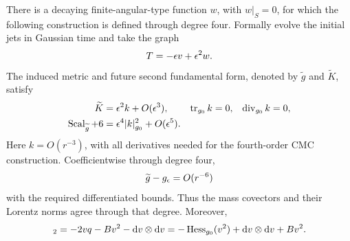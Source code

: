 \begin{lemma}
\label{lem:slice}
There is a decaying finite-angular-type function \(w\), with
\(w|_S=0\), for which the following construction is defined through
degree four.  Formally evolve the initial jets in Gaussian time and
take the graph
\begin{equation}
 T=-\epsilon v+\epsilon^2w.
 \label{quart:time-graph}
\end{equation}
The induced metric and future second fundamental form, denoted by
\(\widetilde g\) and \(\widetilde K\), satisfy
\begin{align}
 \widetilde K&=\epsilon^2k+O(\epsilon^3),
 &\operatorname{tr}_{g_0}k&=0,&\operatorname{div}_{g_0}k&=0,
 \label{quart:leading-k}\\
 \operatorname{Scal}_{\widetilde g}+6
   &=\epsilon^4|k|_{g_0}^2+O(\epsilon^5).
 \label{quart:scalar-four}
\end{align}
Here \(k=O(r^{-3})\), with all derivatives needed for the fourth-order
CMC construction.  Coefficientwise through degree four,
\begin{equation}
 \widetilde g-g_\epsilon=O(r^{-6})
 \label{quart:metric-decay}
\end{equation}
with the required differentiated bounds.  Thus the mass covectors and
their Lorentz norms agree through that degree.  Moreover,
\begin{equation}
 [\widetilde g-g_\eps]_2
   =-2vq-Bv^2-\dd v\otimes\dd v
   =-\Hess_{g_0}(v^2)+\dd v\otimes\dd v+Bv^2.
 \label{quart:metric-two}
\end{equation}
\end{lemma}

